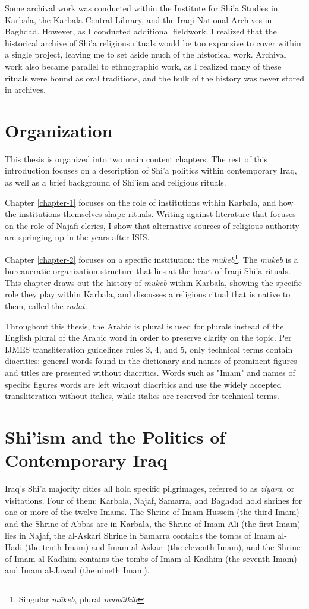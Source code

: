 Some archival work was conducted within the Institute for Shi'a Studies in Karbala, the Karbala Central Library, and the Iraqi National Archives in Baghdad. However, as I conducted additional fieldwork, I realized that the historical archive of Shi'a religious rituals would be too expansive to cover within a single project, leaving me to set aside much of the historical work. Archival work also became parallel to ethnographic work, as I realized many of these rituals were bound as oral traditions, and the bulk of the history was never stored in archives. 

\section{Organization}

This thesis is organized into two main content chapters. The rest of this introduction focuses on a description of Shi'a politics within contemporary Iraq, as well as a brief background of Shi'ism and religious rituals.

Chapter \ref{chapter-1} focuses on the role of institutions within Karbala, and how the institutions themselves shape rituals. Writing against literature that focuses on the role of Najafi clerics, I show that alternative sources of religious authority are springing up in the years after ISIS.

Chapter \ref{chapter-2} focuses on a specific institution: the \emph{mūkeb}\footnote{Singular \emph{mūkeb}, plural \emph{muwālkib}}. The \emph{mūkeb} is a bureaucratic organization structure that lies at the heart of Iraqi Shi'a rituals. This chapter draws out the history of \emph{mūkeb} within Karbala, showing the specific role they play within Karbala, and discusses a religious ritual that is native to them, called the \emph{radat}.

Throughout this thesis, the Arabic is plural is used for plurals instead of the English plural of the Arabic word in order to preserve clarity on the topic. Per IJMES transliteration guidelines rules 3, 4, and 5, only technical terms contain diacritics: general words found in the dictionary and names of prominent figures and titles are presented without diacritics. Words such as "Imam" and names of specific figures words are left without diacritics and use the widely accepted transliteration without italics, while italics are reserved for technical terms.

\section{Shi'ism and the Politics of Contemporary Iraq}
Iraq's Shi'a majority cities all hold specific pilgrimages, referred to as \emph{ziyara}, or visitations. Four of them: Karbala, Najaf, Samarra, and Baghdad hold shrines for one or more of the twelve Imams. The Shrine of Imam Hussein (the third Imam) and the Shrine of Abbas are in Karbala, the Shrine of Imam Ali (the first Imam) lies in Najaf, the al-Askari Shrine in Samarra contains the tombs of Imam al-Hadi (the tenth Imam) and Imam al-Askari (the eleventh Imam), and the Shrine of Imam al-Kadhim contains the tombs of Imam al-Kadhim (the seventh Imam) and Imam al-Jawad (the nineth Imam). 

